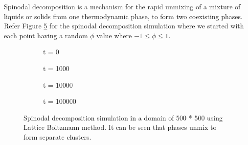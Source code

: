 \documentclass[11pt]{article}
\begin{document}
Spinodal decomposition is a mechanism for the rapid unmixing of a mixture of liquids or solids from one thermodynamic phase, to form two coexisting phases. Refer Figure \ref*{fig:spinod} for the spinodal decomposition simulation where we started with each point having a random $\phi$ value where $ -1 \leq \phi \leq 1.  $
\begin{figure}[h!]
	\centering
	\begin{subfigure}[h!]{4cm}            
		\caption{t = 0}
		\label{Fig:Data1}
	\end{subfigure}
	\begin{subfigure}[h!]{4cm}
		\centering
		\caption{t = 1000}
		\label{Fig:Data2}
	\end{subfigure}
	\begin{subfigure}[h!]{4cm}            
		\caption{t = 10000}
		\label{Fig:Data3}
	\end{subfigure}
	\begin{subfigure}[h!]{4cm}
		\centering
		\caption{t = 100000}
		\label{Fig:Data4}
	\end{subfigure}
	\caption{Spinodal decomposition simulation in a domain of 500 * 500 using Lattice Boltzmann method. It can be seen that phases unmix to form separate clusters.}\label{fig:spinod}
\end{figure}
\end{document}
